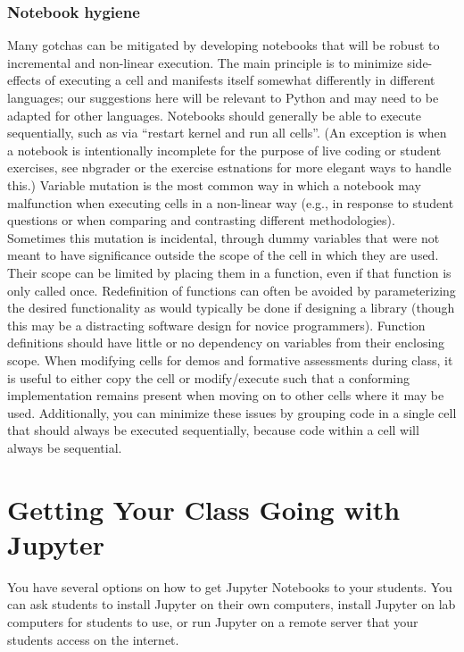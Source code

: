 \documentclass[]{book}
\begin{document}
\subsection{Notebook hygiene}\label{notebook-hygiene}

Many gotchas can be mitigated by developing notebooks that will be
robust to incremental and non-linear execution. The main principle is to
minimize side-effects of executing a cell and manifests itself somewhat
differently in different languages; our suggestions here will be
relevant to Python and may need to be adapted for other languages.
Notebooks should generally be able to execute sequentially, such as via
``restart kernel and run all cells''. (An exception is when a notebook
is intentionally incomplete for the purpose of live coding or student
exercises, see nbgrader or the exercise estnations for more elegant ways
to handle this.) Variable mutation is the most common way in which a
notebook may malfunction when executing cells in a non-linear way (e.g.,
in response to student questions or when comparing and contrasting
different methodologies). Sometimes this mutation is incidental, through
dummy variables that were not meant to have significance outside the
scope of the cell in which they are used. Their scope can be limited by
placing them in a function, even if that function is only called once.
Redefinition of functions can often be avoided by parameterizing the
desired functionality as would typically be done if designing a library
(though this may be a distracting software design for novice
programmers). Function definitions should have little or no dependency
on variables from their enclosing scope. When modifying cells for demos
and formative assessments during class, it is useful to either copy the
cell or modify/execute such that a conforming implementation remains
present when moving on to other cells where it may be used.
Additionally, you can minimize these issues by grouping code in a single
cell that should always be executed sequentially, because code within a
cell will always be sequential.

\chapter{Getting Your Class Going with Jupyter}\label{getting-going}

You have several options on how to get Jupyter Notebooks to your
students. You can ask students to install Jupyter on their own
computers, install Jupyter on lab computers for students to use, or run
Jupyter on a remote server that your students access on the internet.
\end{document}
